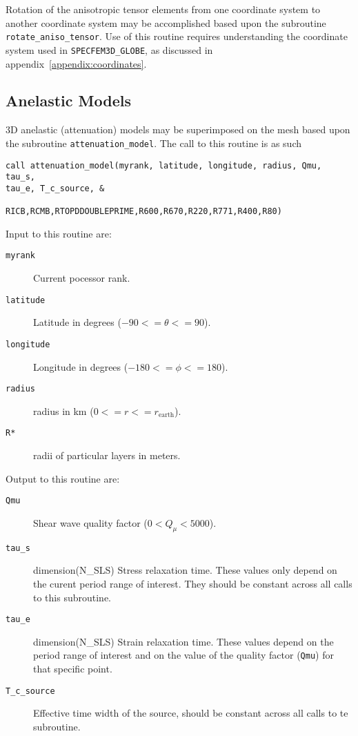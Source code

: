 \documentclass[onecolumn]{article}
\begin{document}
Rotation of the anisotropic tensor elements from one coordinate
system to another
coordinate system may be accomplished based upon the subroutine
\texttt{rotate\_aniso\_tensor}.
Use of this routine requires understanding the coordinate
system used in \texttt{SPECFEM3D\_GLOBE},
as discussed in appendix~\ref{appendix:coordinates}.

%
\subsection{Anelastic Models}

3D anelastic (attenuation) models may be superimposed on the mesh based
upon the subroutine
\texttt{attenuation\_model}.  The call to this routine is as such
\begin{verbatim}
call attenuation_model(myrank, latitude, longitude, radius, Qmu, tau_s,
tau_e, T_c_source, &

RICB,RCMB,RTOPDDOUBLEPRIME,R600,R670,R220,R771,R400,R80)
\end{verbatim}
Input to this routine are:
\begin{description}
\item[\texttt{myrank}] Current pocessor rank.
\item[\texttt{latitude}] Latitude in degrees ($ -90 <= \theta <= 90$).
\item[\texttt{longitude}] Longitude in degrees ($-180 <= \phi <= 180 $).
\item[\texttt{radius}] radius in km ($ 0 <= r <= r_\mathrm{earth}$).
\item[\texttt{R*}] radii of particular layers in meters.
\end{description}
Output to this routine are:
\begin{description}
\item[\texttt{Qmu}] Shear wave quality factor ($ 0 < Q_\mu < 5000 $).
\item[\texttt{tau\_s}] dimension(N\_SLS) Stress relaxation time.  These
values only depend on the
curent period range of interest.  They should be constant across all
calls to this subroutine.
\item[\texttt{tau\_e}] dimension(N\_SLS) Strain relaxation time.  These
values depend on the period
range of interest and on the value of the quality factor (\texttt{Qmu}) for that
specific point.
\item[\texttt{T\_c\_source}] Effective time width of the source, should
be constant across all calls
to te subroutine.
\end{description}
\end{document}
